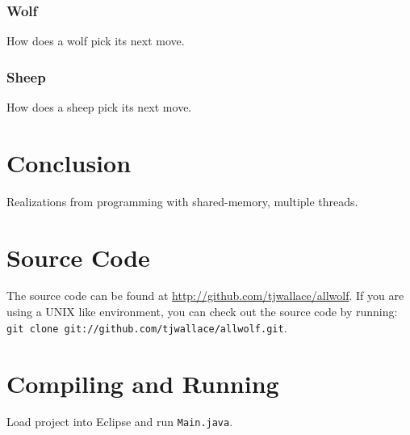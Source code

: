 \documentclass[pdftex,10pt]{article}
\begin{document}
\subsubsection{Wolf}\label{wolfMove}
How does a wolf pick its next move.

\subsubsection{Sheep}\label{sheepMove}
How does a sheep pick its next move.

\section{Conclusion}\label{conclusion}
Realizations from programming with shared-memory, multiple threads.

\appendix
\section{Source Code}
The source code can be found at \url{http://github.com/tjwallace/allwolf}.
If you are using a UNIX like environment, you can check out the source code by running: {\tt git clone git://github.com/tjwallace/allwolf.git}.

\section{Compiling and Running}
Load project into Eclipse and run {\tt Main.java}. 
\end{document}
